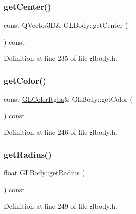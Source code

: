 \subsubsection{\texorpdfstring{getCenter()}{getCenter()}}
{\footnotesize\ttfamily const Q\+Vector3D\& G\+L\+Body\+::get\+Center (\begin{DoxyParamCaption}{ }\end{DoxyParamCaption}) const\hspace{0.3cm}{\ttfamily [inline]}}



Definition at line 235 of file glbody.\+h.

\mbox{\label{class_g_l_body_aee8dcce60e8a36f49572e83bf0600ee2}} 
\subsubsection{\texorpdfstring{getColor()}{getColor()}}
{\footnotesize\ttfamily const \mbox{\hyperlink{class_g_l_color_rgba}{G\+L\+Color\+Rgba}}\& G\+L\+Body\+::get\+Color (\begin{DoxyParamCaption}{ }\end{DoxyParamCaption}) const\hspace{0.3cm}{\ttfamily [inline]}}



Definition at line 246 of file glbody.\+h.

\mbox{\label{class_g_l_body_aed77f06dadb7846e9f1fac0b9a99d482}} 
\subsubsection{\texorpdfstring{getRadius()}{getRadius()}}
{\footnotesize\ttfamily float G\+L\+Body\+::get\+Radius (\begin{DoxyParamCaption}{ }\end{DoxyParamCaption}) const\hspace{0.3cm}{\ttfamily [inline]}}



Definition at line 249 of file glbody.\+h.

\mbox{\label{class_g_l_body_ab6bd6c800df50d3f41af3a135b94080b}} 

